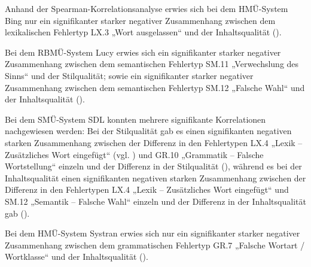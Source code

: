 Anhand der Spearman-Korrelationsanalyse erwies sich bei dem HMÜ-System Bing nur ein signifikanter starker negativer Zusammenhang zwischen dem lexikalischen Fehlertyp LX.3 „Wort ausgelassen“ und der Inhaltsqualität ().

Bei dem RBMÜ-System Lucy erwies sich ein signifikanter starker negativer Zusammenhang zwischen dem semantischen Fehlertyp SM.11 „Verwechslung des Sinns“ und der Stilqualität; sowie ein signifikanter starker negativer Zusammenhang zwischen dem semantischen Fehlertyp SM.12 „Falsche Wahl“ und der Inhaltsqualität ().

Bei dem SMÜ-System SDL konnten mehrere signifikante Korrelationen nachgewiesen werden: Bei der Stilqualität gab es einen signifikanten negativen starken Zusammenhang zwischen der Differenz in den Fehlertypen LX.4 „Lexik -- Zusätzliches Wort eingefügt“ (vgl. ) und GR.10 „Grammatik -- Falsche Wortstellung“ einzeln und der Differenz in der Stilqualität (), während es bei der Inhaltsqualität einen signifikanten negativen starken Zusammenhang zwischen der Differenz in den Fehlertypen LX.4 „Lexik -- Zusätzliches Wort eingefügt“ und SM.12 „Semantik -- Falsche Wahl“ einzeln und der Differenz in der Inhaltsqualität gab ().

Bei dem HMÜ-System Systran erwies sich nur ein signifikanter starker negativer Zusammenhang zwischen dem grammatischen Fehlertyp GR.7 „Falsche Wortart / Wortklasse“ und der Inhaltsqualität ().


